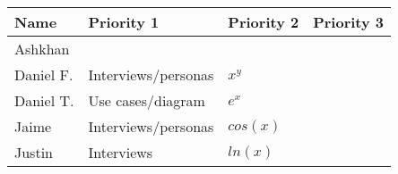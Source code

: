 \documentclass{article}
\begin{document}
\begin{table}[]
\begin{tabular}{|l|l|l|l|}
\hline
 \textbf{Name}&\textbf{Priority 1}  &\textbf{Priority 2}  &\textbf{Priority 3}  \\ \hline
 Ashkhan&  &  &  \\ \hline
 Daniel F.&Interviews/personas  &$x^y$  &  \\ \hline
 Daniel T.&Use cases/diagram  &$e^x$  &  \\ \hline
 Jaime&Interviews/personas  &$cos(x)$  &  \\ \hline
 Justin&Interviews  &$ln(x)$  &  \\ \hline
\end{tabular}
\end{table}
\end{document}
